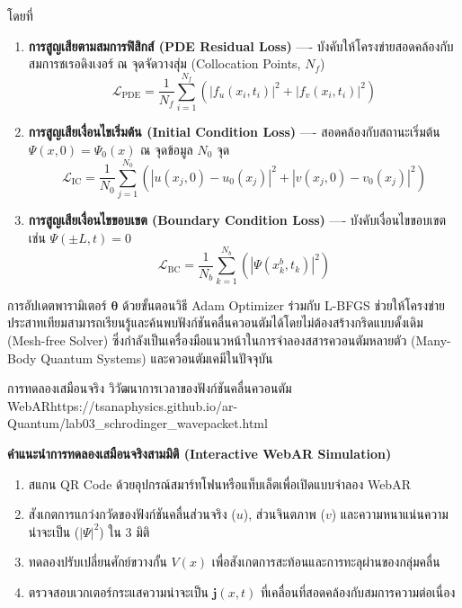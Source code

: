 โดยที่
\begin{enumerate}
    \item \textbf{การสูญเสียตามสมการฟิสิกส์ (PDE Residual Loss)} ---- บังคับให้โครงข่ายสอดคล้องกับสมการชเรอดิงเงอร์ ณ จุดจัดวางสุ่ม (Collocation Points, $N_f$)
    \begin{equation}
    \mathcal{L}_{\text{PDE}} = \frac{1}{N_f} \sum_{i=1}^{N_f} \left( |f_u(x_i, t_i)|^2 + |f_v(x_i, t_i)|^2 \right)
    \end{equation}
    \item \textbf{การสูญเสียเงื่อนไขเริ่มต้น (Initial Condition Loss)} ---- สอดคล้องกับสถานะเริ่มต้น $\Psi(x, 0) = \Psi_0(x)$ ณ จุดข้อมูล $N_0$ จุด
    \begin{equation}
    \mathcal{L}_{\text{IC}} = \frac{1}{N_0} \sum_{j=1}^{N_0} \left( |u(x_j, 0) - u_0(x_j)|^2 + |v(x_j, 0) - v_0(x_j)|^2 \right)
    \end{equation}
    \item \textbf{การสูญเสียเงื่อนไขขอบเขต (Boundary Condition Loss)} ---- บังคับเงื่อนไขขอบเขต เช่น $\Psi(\pm L, t) = 0$
    \begin{equation}
    \mathcal{L}_{\text{BC}} = \frac{1}{N_b} \sum_{k=1}^{N_b} \left( |\Psi(x_k^b, t_k)|^2 \right)
    \end{equation}
\end{enumerate}

การอัปเดตพารามิเตอร์ $\boldsymbol{\theta}$ ด้วยขั้นตอนวิธี Adam Optimizer ร่วมกับ L-BFGS ช่วยให้โครงข่ายประสาทเทียมสามารถเรียนรู้และค้นพบฟังก์ชันคลื่นควอนตัมได้โดยไม่ต้องสร้างกริดแบบดั้งเดิม (Mesh-free Solver) ซึ่งกำลังเป็นเครื่องมือแนวหน้าในการจำลองสสารควอนตัมหลายตัว (Many-Body Quantum Systems) และควอนตัมเคมีในปัจจุบัน

\begin{qrcodelabbox}{การทดลองเสมือนจริง วิวัฒนาการเวลาของฟังก์ชันคลื่นควอนตัม WebAR}{https://tsanaphysics.github.io/ar-Quantum/lab03_schrodinger_wavepacket.html}
\begin{minipage}[c]{0.70\textwidth}
\textbf{คำแนะนำการทดลองเสมือนจริงสามมิติ (Interactive WebAR Simulation)}
\begin{enumerate}
    \item สแกน QR Code ด้วยอุปกรณ์สมาร์ทโฟนหรือแท็บเล็ตเพื่อเปิดแบบจำลอง WebAR
    \item สังเกตการแกว่งกวัดของฟังก์ชันคลื่นส่วนจริง ($u$), ส่วนจินตภาพ ($v$) และความหนาแน่นความน่าจะเป็น ($|\Psi|^2$) ใน 3 มิติ
    \item ทดลองปรับเปลี่ยนศักย์ขวางกั้น $V(x)$ เพื่อสังเกตการสะท้อนและการทะลุผ่านของกลุ่มคลื่น
    \item ตรวจสอบเวกเตอร์กระแสความน่าจะเป็น $\mathbf{j}(x, t)$ ที่เคลื่อนที่สอดคล้องกับสมการความต่อเนื่อง
\end{enumerate}
\end{minipage}
\hfill
\begin{minipage}[c]{0.25\textwidth}
\centering
{}
\end{minipage}
\end{qrcodelabbox}

